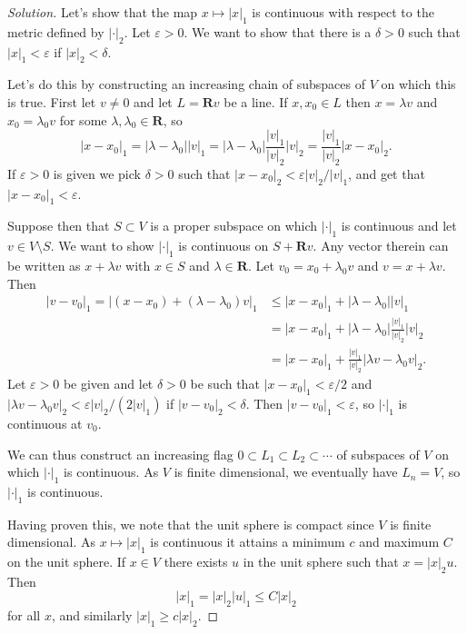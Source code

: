 \documentclass[11pt]{article}
\theoremstyle{definition}
\newcommand{\kk}[1]{\mathbf{#1}}
\begin{document}
\begin{proof}[Solution]
Let's show that the map $x \mapsto |x|_1$ is continuous with respect to
the metric defined by $|\cdot|_2$.
Let $\varepsilon > 0$.
We want to show that there is a $\delta > 0$ such that $|x|_1 < \varepsilon$
if $|x|_2 < \delta$.

Let's do this by constructing an increasing chain of subspaces of $V$ on
which this is true.
First let $v \not= 0$ and let $L = \kk R v$ be a line.
If $x, x_0 \in L$ then $x = \lambda v$ and $x_0 = \lambda_0 v$ for some
$\lambda, \lambda_0 \in \kk R$, so
\[
|x - x_0|_1
= |\lambda - \lambda_0| |v|_1
= |\lambda - \lambda_0| \frac{|v|_1}{|v|_2} |v|_2
= \frac{|v|_1}{|v|_2} |x - x_0|_2.
\]
If $\varepsilon > 0$ is given we pick $\delta > 0$ such that
$|x - x_0|_2 < \varepsilon |v|_2 / |v|_1$, and get that $|x - x_0|_1 <
\varepsilon$.

Suppose then that $S \subset V$ is a proper subspace on which $|\cdot|_1$ is
continuous and let $v \in V \setminus S$.
We want to show $|\cdot|_1$ is continuous on $S + \kk R v$.
Any vector therein can be written as $x + \lambda v$ with $x \in S$ and
$\lambda \in \kk R$.
Let $v_0 = x_0 + \lambda_0 v$ and $v = x + \lambda v$.
Then
\begin{align*}
|v - v_0|_1
= |(x - x_0) + (\lambda - \lambda_0) v|_1
&\leq |x - x_0|_1 + |\lambda - \lambda_0| |v|_1
\\
&= |x - x_0|_1 + |\lambda - \lambda_0| \frac{|v|_1}{|v|_2} |v|_2
\\
&= |x - x_0|_1 + \frac{|v|_1}{|v|_2} |\lambda v - \lambda_0 v|_2.
\end{align*}
Let $\varepsilon > 0$ be given and let $\delta > 0$ be such that
$|x - x_0|_1 < \varepsilon / 2$
and $|\lambda v - \lambda_0 v|_2 < \varepsilon |v|_2 / (2 |v|_1)$
if $|v - v_0|_2 < \delta$.
Then $|v - v_0|_1 < \varepsilon$, so $|\cdot|_1$ is continuous at $v_0$.

We can thus construct an increasing flag $0 \subset L_1 \subset L_2 \subset
\cdots$ of subspaces of $V$ on which $|\cdot|_1$ is continuous.
As $V$ is finite dimensional, we eventually have $L_n = V$, so $|\cdot|_1$ is
continuous.

Having proven this, we note that the unit sphere is compact since $V$ is
finite dimensional.
As $x \mapsto |x|_1$ is continuous it attains a minimum $c$ and maximum $C$ on
the unit sphere.
If $x \in V$ there exists $u$ in the unit sphere such that $x = |x|_2 u$.
Then
\[
|x|_1 = |x|_2 |u|_1 \leq C |x|_2
\]
for all $x$, and similarly $|x|_1 \geq c |x|_2$.
\end{proof}
\end{document}
